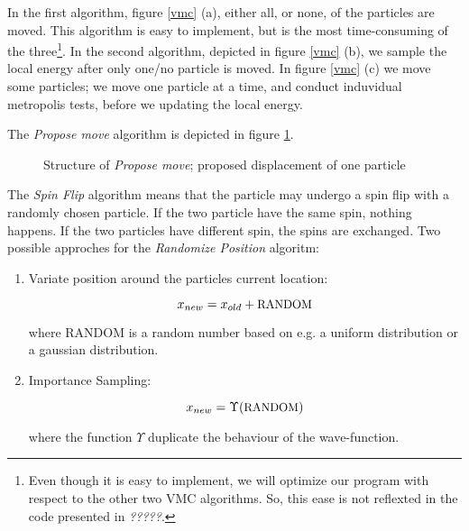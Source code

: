 In the first algorithm, figure \ref{vmc} (a), either all, or none, of
the particles are moved. This algorithm is easy to implement, but is
the most time-consuming of the three\footnote{Even though it is easy
  to implement, we will optimize our program with respect to the other
  two VMC algorithms. So, this ease is not reflexted in the code
  presented in \emph{?????}.}. In the second algorithm, depicted 
in figure \ref{vmc} (b), we sample the local energy after only one/no
particle is moved. In figure \ref{vmc} (c) we move some particles; 
we move one particle at a time, and conduct induvidual metropolis tests,
before we updating the local energy.

The \emph{Propose move} algorithm is depicted in figure \ref{propose_move}.

\begin{figure}[hbtp]
\begin{center}
  \caption{Structure of \emph{Propose move}; proposed displacement of
    one particle}
  \label{propose_move}
\end{center}
\end{figure}

The \emph{Spin Flip} algorithm means that the particle may undergo a
spin flip with a randomly chosen particle. If the two particle have
the same spin, nothing happens. If the two particles have
different spin, the spins are exchanged. \newline
Two possible approches for the \emph{Randomize Position} algoritm:

\begin{enumerate}
  \item{}
    Variate position around the particles current location:

    \begin{equation*}
      x_{new}=x_{old}+\text{\small{RANDOM}}
    \end{equation*}

    where RANDOM is a random number based on e.g. a uniform distribution
    or a gaussian distribution.
  \item{}
    Importance Sampling:

    \begin{equation*}
      x_{new}=\Upsilon(\text{\small{RANDOM}})
    \end{equation*}

    where the function $\Upsilon$ duplicate the behaviour of the
    wave-function.
\end{enumerate}




